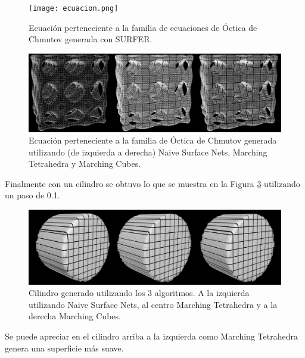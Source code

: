 \documentclass[12pt]{article}
\begin{document}
\begin{figure}[h!]
\texttt{[image: ecuacion.png]}
\caption{Ecuación  perteneciente a la familia de ecuaciones de Óctica de Chmutov generada con SURFER.}
\label{CHSURFER}
\end{figure}

\begin{figure}[h!]
\includegraphics[width=\linewidth,center]{compec2.png}
\caption{Ecuación perteneciente a la familia de Óctica de Chmutov generada utilizando (de izquierda a derecha)  Naive Surface Nets, Marching Tetrahedra y  Marching Cubes.}
  \label{ecuacionG}
\end{figure}

Finalmente con un cilindro se obtuvo lo que se muestra en la Figura \ref{cilindro1G}  utilizando un paso de 0.1.

\begin{figure}[h!]
\includegraphics[width=\linewidth,center]{compec3.png}
\caption{Cilindro generado utilizando los 3 algoritmos.  A la izquierda utilizando Naive Surface Nets, al centro Marching Tetrahedra y a la derecha Marching Cubes.}
  \label{cilindro1G}
\end{figure}

Se puede apreciar en el cilindro arriba a la izquierda  como Marching Tetrahedra genera una superficie más suave.
\end{document}
